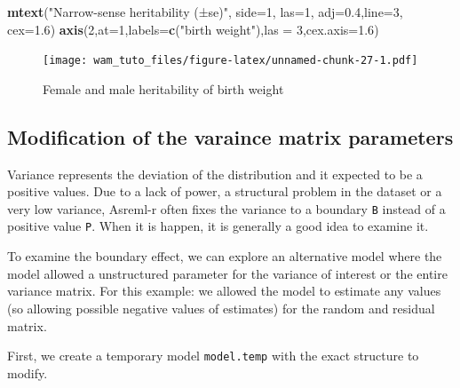 \documentclass[
  12pt,
]{book}
\newenvironment{Shaded}{\begin{snugshade}}{\end{snugshade}}
\newcommand{\DataTypeTok}[1]{\textcolor[rgb]{0.13,0.29,0.53}{#1}}
\newcommand{\DecValTok}[1]{\textcolor[rgb]{0.00,0.00,0.81}{#1}}
\newcommand{\FloatTok}[1]{\textcolor[rgb]{0.00,0.00,0.81}{#1}}
\newcommand{\KeywordTok}[1]{\textcolor[rgb]{0.13,0.29,0.53}{\textbf{#1}}}
\newcommand{\NormalTok}[1]{#1}
\newcommand{\StringTok}[1]{\textcolor[rgb]{0.31,0.60,0.02}{#1}}
\begin{document}
\begin{Shaded}
\begin{Highlighting}[]
\KeywordTok{mtext}\NormalTok{(}\StringTok{"Narrow{-}sense heritability (±se)"}\NormalTok{, }\DataTypeTok{side=}\DecValTok{1}\NormalTok{, }\DataTypeTok{las=}\DecValTok{1}\NormalTok{, }\DataTypeTok{adj=}\FloatTok{0.4}\NormalTok{,}\DataTypeTok{line=}\DecValTok{3}\NormalTok{, }\DataTypeTok{cex=}\FloatTok{1.6}\NormalTok{)}
\KeywordTok{axis}\NormalTok{(}\DecValTok{2}\NormalTok{,}\DataTypeTok{at=}\DecValTok{1}\NormalTok{,}\DataTypeTok{labels=}\KeywordTok{c}\NormalTok{(}\StringTok{"birth weight"}\NormalTok{),}\DataTypeTok{las =} \DecValTok{3}\NormalTok{,}\DataTypeTok{cex.axis=}\FloatTok{1.6}\NormalTok{)}
\end{Highlighting}
\end{Shaded}

\begin{figure}
\centering
\texttt{[image: wam\_tuto\_files/figure-latex/unnamed-chunk-27-1.pdf]}
\caption{\label{fig:unnamed-chunk-27}Female and male heritability of birth weight}
\end{figure}

\hypertarget{modification-of-the-varaince-matrix-parameters}{%
\subsection{Modification of the varaince matrix parameters}\label{modification-of-the-varaince-matrix-parameters}}

Variance represents the deviation of the distribution and it expected to be a positive values.
Due to a lack of power, a structural problem in the dataset or a very low variance, Asreml-r often fixes the variance to a boundary \texttt{B} instead of a positive value \texttt{P}. When it is happen, it is generally a good idea to examine it.

To examine the boundary effect, we can explore an alternative model where the model allowed a unstructured parameter for the variance of interest or the entire variance matrix. For this example: we allowed the model to estimate any values (so allowing possible negative values of estimates) for the random and residual matrix.

First, we create a temporary model \texttt{model.temp} with the exact structure to modify.
\end{document}
